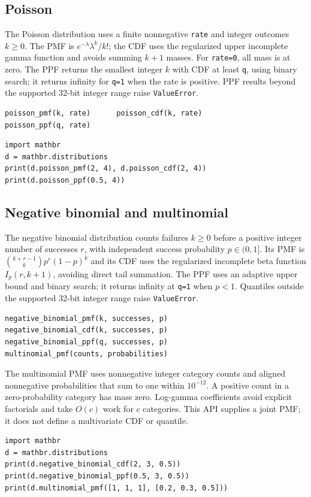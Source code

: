 \documentclass[11pt,a4paper]{article}
\begin{document}
\subsection{Poisson}
The Poisson distribution uses a finite nonnegative \verb|rate| and integer outcomes $k\geq0$. The PMF is $e^{-\lambda}\lambda^k/k!$; the CDF uses the regularized upper incomplete gamma function and avoids summing $k+1$ masses. For \verb|rate=0|, all mass is at zero. The PPF returns the smallest integer $k$ with CDF at least \verb|q|, using binary search; it returns infinity for \verb|q=1| when the rate is positive. PPF results beyond the supported 32-bit integer range raise \verb|ValueError|.
\begin{verbatim}
poisson_pmf(k, rate)      poisson_cdf(k, rate)
poisson_ppf(q, rate)
\end{verbatim}
\begin{verbatim}
import mathbr
d = mathbr.distributions
print(d.poisson_pmf(2, 4), d.poisson_cdf(2, 4))
print(d.poisson_ppf(0.5, 4))
\end{verbatim}

\subsection{Negative binomial and multinomial}
The negative binomial distribution counts failures $k\geq0$ before a positive integer number of successes $r$, with independent success probability $p\in(0,1]$. Its PMF is $\binom{k+r-1}{k}p^r(1-p)^k$ and its CDF uses the regularized incomplete beta function $I_p(r,k+1)$, avoiding direct tail summation. The PPF uses an adaptive upper bound and binary search; it returns infinity at \verb|q=1| when $p<1$. Quantiles outside the supported 32-bit integer range raise \verb|ValueError|.
\begin{verbatim}
negative_binomial_pmf(k, successes, p)
negative_binomial_cdf(k, successes, p)
negative_binomial_ppf(q, successes, p)
multinomial_pmf(counts, probabilities)
\end{verbatim}
The multinomial PMF uses nonnegative integer category counts and aligned nonnegative probabilities that sum to one within $10^{-12}$. A positive count in a zero-probability category has mass zero. Log-gamma coefficients avoid explicit factorials and take $O(c)$ work for $c$ categories. This API supplies a joint PMF; it does not define a multivariate CDF or quantile.
\begin{verbatim}
import mathbr
d = mathbr.distributions
print(d.negative_binomial_cdf(2, 3, 0.5))
print(d.negative_binomial_ppf(0.5, 3, 0.5))
print(d.multinomial_pmf([1, 1, 1], [0.2, 0.3, 0.5]))
\end{verbatim}
\end{document}

